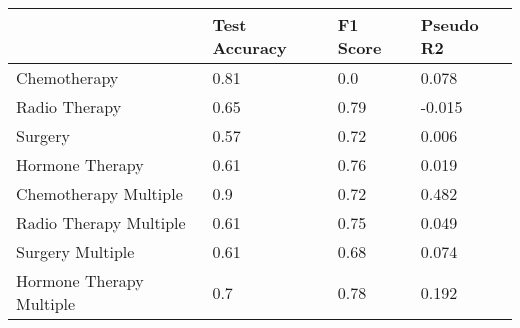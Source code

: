 \begin{tabular}{llll}
\toprule
 & Test Accuracy & F1 Score & Pseudo R2 \\
\midrule
Chemotherapy & 0.81 & 0.0 & 0.078 \\
Radio Therapy & 0.65 & 0.79 & -0.015 \\
Surgery & 0.57 & 0.72 & 0.006 \\
Hormone Therapy & 0.61 & 0.76 & 0.019 \\
Chemotherapy Multiple & 0.9 & 0.72 & 0.482 \\
Radio Therapy Multiple & 0.61 & 0.75 & 0.049 \\
Surgery Multiple & 0.61 & 0.68 & 0.074 \\
Hormone Therapy Multiple & 0.7 & 0.78 & 0.192 \\
\bottomrule
\end{tabular}
